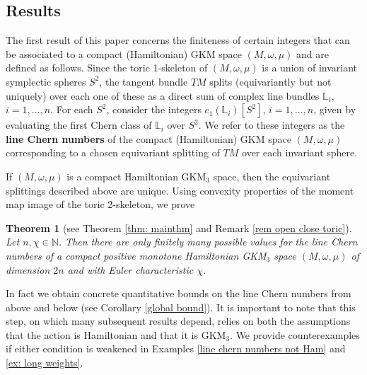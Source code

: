 \documentclass[12pt,a4paper]{amsart}
\newcommand{\NN}{\mathbb{N}}
\newtheorem{thm}{Theorem}[section]
\theoremstyle{plain}
\theoremstyle{definition}
\begin{document}
\subsection{Results} The first result of this paper concerns the finiteness of certain integers that can be associated to a compact (Hamiltonian) GKM space $(M,\omega,\mu)$ and are defined as follows. 
Since the toric 1-skeleton of $(M,\omega,\mu)$ is a union of invariant symplectic spheres $S^2$, the tangent bundle $TM$ splits (equivariantly but not uniquely) over each one of these as a direct sum of complex line bundles $\mathbb{L}_i$, $i=1,\ldots,n$. For each $S^2$, consider the integers $c_1(\mathbb{L}_i)[S^2]$, $i=1,\ldots,n$, given by evaluating the first Chern class of $\mathbb{L}_i$ over $S^2$.  
We refer to these integers as the \textbf{line Chern numbers} of the compact (Hamiltonian) GKM space $(M,\omega,\mu)$ corresponding to a chosen equivariant splitting of $TM$ over each invariant
sphere. 

If $(M,\omega,\mu)$ is a compact Hamiltonian GKM$_3$ space, then the equivariant splittings described above are unique. Using convexity properties of the moment map image of the toric 2-skeleton, we prove


\begin{thm}[see Theorem \ref{thm: mainthm} and Remark \ref{rem open close toric}]\label{thm: mainthmintro}
Let $n,\chi\in \NN$. Then there are only finitely many possible values for the line Chern numbers of a compact 
positive monotone
Hamiltonian GKM$_3$ space $(M,\omega,\mu)$ of dimension $2n$ and with Euler characteristic $\chi$.
\end{thm}
In fact we obtain concrete quantitative bounds on the line Chern numbers from above and below (see Corollary \ref{global bound}). It is important to note that this step, on which many subsequent results depend, relies on both the assumptions that the action is Hamiltonian and that it is GKM$_3$.
We provide counterexamples if either condition is weakened in Examples \ref{line chern numbers not Ham} and \ref{ex: long weights}.
\end{document}
